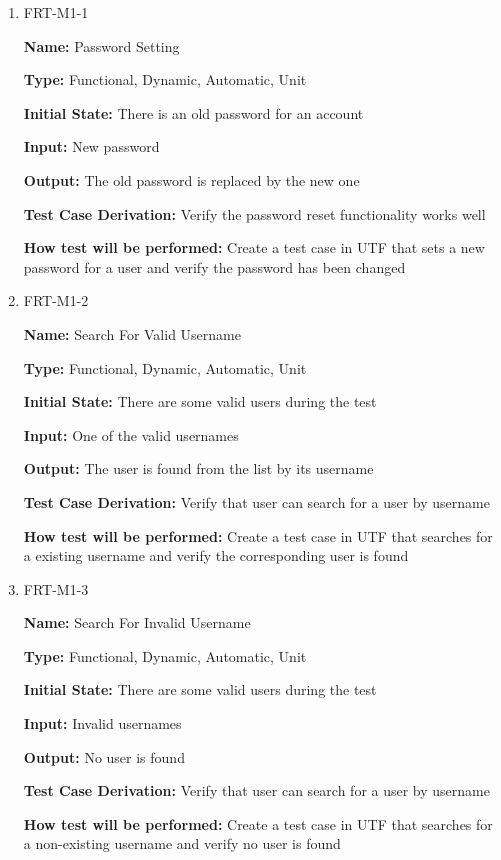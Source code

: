 \documentclass[12pt, titlepage]{article}
\begin{document}
\begin{enumerate}

\item{FRT-M1-1}

\textbf{Name:} Password Setting

\textbf{Type:} Functional, Dynamic, Automatic, Unit
					
\textbf{Initial State:} There is an old password for an account
					
\textbf{Input:} New password
					
\textbf{Output:} The old password is replaced by the new one

\textbf{Test Case Derivation:} Verify the password reset functionality works well

\textbf{How test will be performed:} Create a test case in UTF that sets a new password for a user and verify the password has been changed

\item{FRT-M1-2}

\textbf{Name:} Search For Valid Username

\textbf{Type:} Functional, Dynamic, Automatic, Unit
					
\textbf{Initial State:} There are some valid users during the test
					
\textbf{Input:} One of the valid usernames
					
\textbf{Output:} The user is found from the list by its username

\textbf{Test Case Derivation:} Verify that user can search for a user by username

\textbf{How test will be performed:} Create a test case in UTF that searches for a existing username and verify the corresponding user is found

\item{FRT-M1-3}

\textbf{Name:} Search For Invalid Username

\textbf{Type:} Functional, Dynamic, Automatic, Unit
					
\textbf{Initial State:} There are some valid users during the test
					
\textbf{Input:} Invalid usernames
					
\textbf{Output:} No user is found

\textbf{Test Case Derivation:} Verify that user can search for a user by username

\textbf{How test will be performed:} Create a test case in UTF that searches for a non-existing username and verify no user is found


\end{enumerate}
\end{document}
